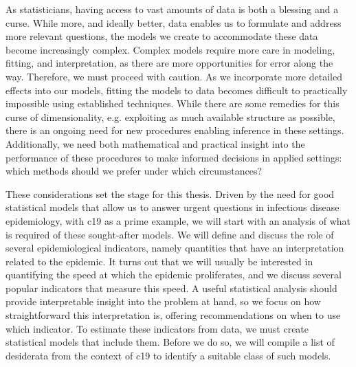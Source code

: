 %

As statisticians, having access to vast amounts of data is both a blessing and a curse. While more, and ideally better, data enables us to formulate and address more relevant questions, the models we create to accommodate these data become increasingly complex. Complex models require more care in modeling, fitting, and interpretation, as there are more opportunities for error along the way. Therefore, we must proceed with caution. As we incorporate more detailed effects into our models, fitting the models to data becomes difficult to practically impossible using established techniques. While there are some remedies for this curse of dimensionality, e.g. exploiting as much available structure as possible, there is an ongoing need for new procedures enabling inference in these settings. Additionally, we need both mathematical and practical insight into the performance of these procedures to make informed decisions in applied settings: which methods should we prefer under which circumstances?

These considerations set the stage for this thesis. Driven by the need for good statistical models that allow us to answer urgent questions in infectious disease epidemiology, with \acrshort{c19} as a prime example, we will start with an analysis of what is required of these sought-after models. We will define and discuss the role of several epidemiological indicators, namely quantities that have an interpretation related to the epidemic. It turns out that we will usually be interested in quantifying the speed at which the epidemic proliferates, and we discuss several popular indicators that measure this speed. A useful statistical analysis should provide interpretable insight into the problem at hand, so we focus on how straightforward this interpretation is, offering recommendations on when to use which indicator. To estimate these indicators from data, we must create statistical models that include them. Before we do so, we will compile a list of desiderata from the context of \acrshort{c19} to identify a suitable class of such models. 

